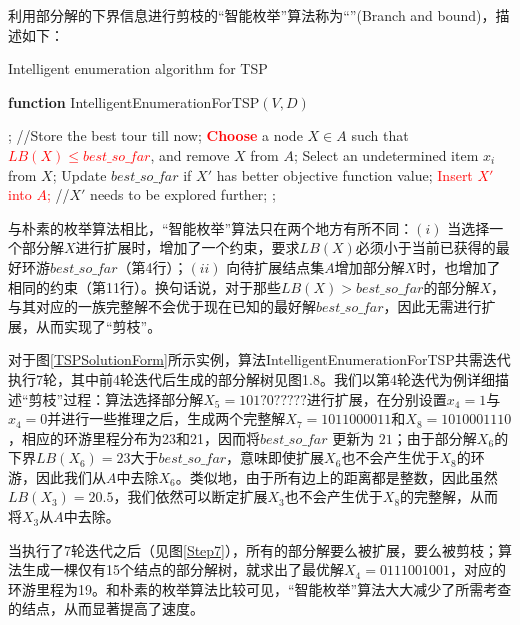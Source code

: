        利用部分解的下界信息进行剪枝的“智能枚举”算法称为“”(Branch and bound)，描述如下：
\begin{algorithm}[H]
\caption{Intelligent enumeration algorithm for TSP}\label{TSPIntelligentEnumerationAlgo}   
{\bf function} {\sc IntelligentEnumerationForTSP$(V, D)$}	
\begin{algorithmic}[1]
; //Store the best tour till now; 
	\STATE \textcolor{red}{\bf Choose} a node $X\in A$ such that \textcolor{red}{\bf $LB(X) \leq best\_so\_far$}, and remove $X$ from $A$;
	\STATE Select an undetermined item $x_i$ from $X$; 
			\STATE Update $best\_so\_far$ if $X'$ has better objective function value; 
		\ELSIF{\textcolor{red}{\bf $LB(X') \leq best\_so\_far$}  }
				\STATE \textcolor{red}{Insert $X'$ into $A$;} //$X'$ needs to be explored further;
		\ENDIF
	\ENDFOR
\ENDWHILE
{};
\end{algorithmic}
\end{algorithm}

 与朴素的枚举算法相比，“智能枚举”算法只在两个地方有所不同：$(i)$ 当选择一个部分解$X$进行扩展时，增加了一个约束，要求$LB(X)$必须小于当前已获得的最好环游$best\_so\_far$（第4行）；$(ii)$ 向待扩展结点集$A$增加部分解$X$时，也增加了相同的约束（第11行）。换句话说，对于那些$LB(X)>best\_so\_far$的部分解$X$，与其对应的一族完整解不会优于现在已知的最好解$best\_so\_far$，因此无需进行扩展，从而实现了“剪枝”。
 
 对于图\ref{TSPSolutionForm}所示实例，算法{\sc IntelligentEnumerationForTSP}共需迭代执行7轮，其中前4轮迭代后生成的部分解树见图1.8。我们以第4轮迭代为例详细描述“剪枝”过程：算法选择部分解$X_{5}=101?0?????$进行扩展，在分别设置$x_{4}=1$与$x_{4}=0$并进行一些推理之后，生成两个完整解$X_{7}=1011000011$和$X_{8}=1010001110$，相应的环游里程分布为23和21，因而将$best\_so\_far$ 更新为 $21$；由于部分解$X_{6}$的下界$LB(X_{6})=23$大于$best\_so\_far$，意味即使扩展$X_{6}$也不会产生优于$X_{8}$的环游，因此我们从$A$中去除$X_{6}$。类似地，由于所有边上的距离都是整数，因此虽然$LB(X_{3})=20.5$，我们依然可以断定扩展$X_{3}$也不会产生优于$X_{8}$的完整解，从而将$X_{3}$从$A$中去除。
 
 当执行了7轮迭代之后（见图\ref{Step7}），所有的部分解要么被扩展，要么被剪枝；算法生成一棵仅有15个结点的部分解树，就求出了最优解$X_{4}=0111001001$，对应的环游里程为19。和朴素的枚举算法比较可见，“智能枚举”算法大大减少了所需考查的结点，从而显著提高了速度。
 
